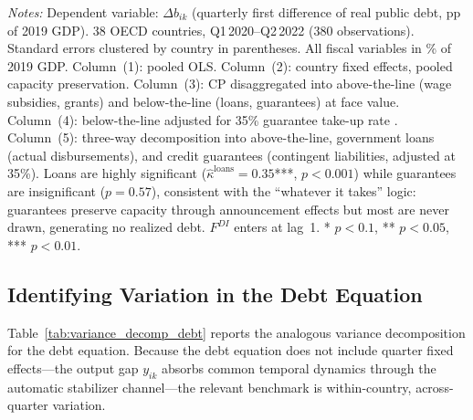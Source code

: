 \documentclass[12pt, a4paper]{article}
\begin{document}
\begin{table}[H]
\parbox{\textwidth}{\scriptsize\textit{Notes:} Dependent variable:
$\Delta b_{ik}$ (quarterly first difference of real public debt, pp of
2019 GDP). 38 OECD countries, Q1\,2020--Q2\,2022 (380 observations).
Standard errors clustered by country in parentheses. All fiscal
variables in \% of 2019 GDP. Column~(1): pooled OLS. Column~(2):
country fixed effects, pooled capacity preservation. Column~(3): CP
disaggregated into above-the-line (wage subsidies, grants) and
below-the-line (loans, guarantees) at face value. Column~(4):
below-the-line adjusted for 35\% guarantee take-up rate
\citep{imf2022fiscalmonitor}. Column~(5): three-way decomposition into
above-the-line, government loans (actual disbursements), and credit
guarantees (contingent liabilities, adjusted at 35\%). Loans are highly
significant ($\hat{\kappa}^{\text{loans}} = 0.35$***, $p < 0.001$)
while guarantees are insignificant ($p = 0.57$), consistent with the
``whatever it takes'' logic: guarantees preserve capacity through
announcement effects but most are never drawn, generating no realized
debt. $F^{DI}$ enters at lag~1. * $p<0.1$, ** $p<0.05$, *** $p<0.01$.}
\end{table}

\subsection{Identifying Variation in the Debt Equation}

Table~\ref{tab:variance_decomp_debt} reports the analogous 
variance decomposition for the debt equation. Because the debt 
equation does not include quarter fixed effects---the output gap 
$y_{ik}$ absorbs common temporal dynamics through the automatic 
stabilizer channel---the relevant benchmark is within-country, 
across-quarter variation.
\end{document}
